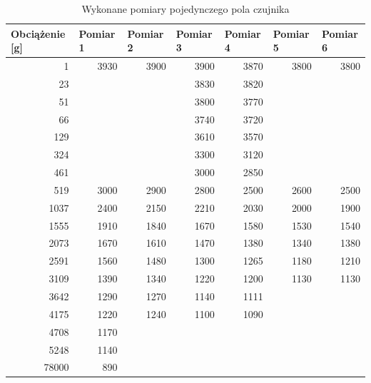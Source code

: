 \begin{table}[!h]
\centering
\caption{Wykonane pomiary pojedynczego pola czujnika}
\begin{tabular}{|r|r|r|r|r|r|l|}
\hline
\multicolumn{1}{|l|}{Obciążenie {[}g{]}} &
  \multicolumn{1}{l|}{Pomiar 1} &
  \multicolumn{1}{l|}{Pomiar 2} &
  \multicolumn{1}{l|}{Pomiar 3} &
  \multicolumn{1}{l|}{Pomiar 4} &
  \multicolumn{1}{l|}{Pomiar 5} &
  Pomiar 6 \\ \hline
1     & 3930 & 3900 & 3900 & 3870 & 3800 & \multicolumn{1}{r|}{3800} \\ \hline
23    &      &      & 3830 & 3820 &      &                           \\ \hline
51    &      &      & 3800 & 3770 &      &                           \\ \hline
66    &      &      & 3740 & 3720 &      &                           \\ \hline
129   &      &      & 3610 & 3570 &      &                           \\ \hline
324   &      &      & 3300 & 3120 &      &                           \\ \hline
461   &      &      & 3000 & 2850 &      &                           \\ \hline
519   & 3000 & 2900 & 2800 & 2500 & 2600 & \multicolumn{1}{r|}{2500} \\ \hline
1037  & 2400 & 2150 & 2210 & 2030 & 2000 & \multicolumn{1}{r|}{1900} \\ \hline
1555  & 1910 & 1840 & 1670 & 1580 & 1530 & \multicolumn{1}{r|}{1540} \\ \hline
2073  & 1670 & 1610 & 1470 & 1380 & 1340 & \multicolumn{1}{r|}{1380} \\ \hline
2591  & 1560 & 1480 & 1300 & 1265 & 1180 & \multicolumn{1}{r|}{1210} \\ \hline
3109  & 1390 & 1340 & 1220 & 1200 & 1130 & \multicolumn{1}{r|}{1130} \\ \hline
3642  & 1290 & 1270 & 1140 & 1111 &      &                           \\ \hline
4175  & 1220 & 1240 & 1100 & 1090 &      &                           \\ \hline
4708  & 1170 &      &      &      &      &                           \\ \hline
5248  & 1140 &      &      &      &      &                           \\ \hline
78000 & 890  &      &      &      &      &                           \\ \hline
\end{tabular}
\label{t_badanie_1_pomiary}
\end{table}


